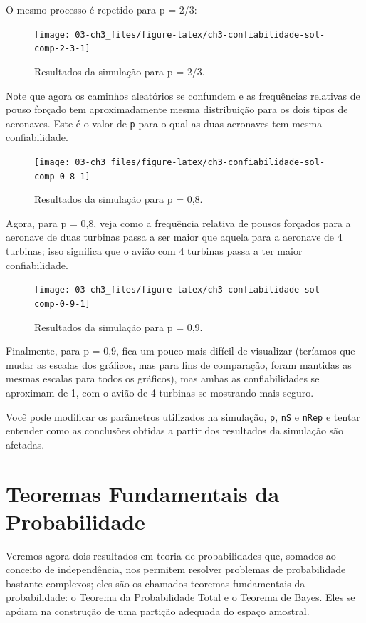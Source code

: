 \documentclass[
]{book}
\theoremstyle{definition}
\theoremstyle{definition}
\theoremstyle{definition}
\theoremstyle{remark}
\begin{document}
O mesmo processo é repetido para p = 2/3:

\begin{figure}
\texttt{[image: 03-ch3\_files/figure-latex/ch3-confiabilidade-sol-comp-2-3-1]} \caption{Resultados da simulação para p = 2/3.}\label{fig:ch3-confiabilidade-sol-comp-2-3}
\end{figure}

Note que agora os caminhos aleatórios se confundem e as frequências relativas de pouso forçado tem aproximadamente mesma distribuição para os dois tipos de aeronaves. Este é o valor de \texttt{p} para o qual as duas aeronaves tem mesma confiabilidade.

\begin{figure}
\texttt{[image: 03-ch3\_files/figure-latex/ch3-confiabilidade-sol-comp-0-8-1]} \caption{Resultados da simulação para p = 0,8.}\label{fig:ch3-confiabilidade-sol-comp-0-8}
\end{figure}

Agora, para p = 0,8, veja como a frequência relativa de pousos forçados para a aeronave de duas turbinas passa a ser maior que aquela para a aeronave de 4 turbinas; isso significa que o avião com 4 turbinas passa a ter maior confiabilidade.

\begin{figure}
\texttt{[image: 03-ch3\_files/figure-latex/ch3-confiabilidade-sol-comp-0-9-1]} \caption{Resultados da simulação para p = 0,9.}\label{fig:ch3-confiabilidade-sol-comp-0-9}
\end{figure}

Finalmente, para p = 0,9, fica um pouco mais difícil de visualizar (teríamos que mudar as escalas dos gráficos, mas para fins de comparação, foram mantidas as mesmas escalas para todos os gráficos), mas ambas as confiabilidades se aproximam de 1, com o avião de 4 turbinas se mostrando mais seguro.

Você pode modificar os parâmetros utilizados na simulação, \texttt{p}, \texttt{nS} e \texttt{nRep} e tentar entender como as conclusões obtidas a partir dos resultados da simulação são afetadas.

\hypertarget{teoremas-fundamentais-da-probabilidade}{%
\chapter{Teoremas Fundamentais da Probabilidade}\label{teoremas-fundamentais-da-probabilidade}}

Veremos agora dois resultados em teoria de probabilidades que, somados ao conceito de independência, nos permitem resolver problemas de probabilidade bastante complexos; eles são os chamados teoremas fundamentais da probabilidade: o Teorema da Probabilidade Total e o Teorema de Bayes. Eles se apóiam na construção de uma partição adequada do espaço amostral.
\end{document}
